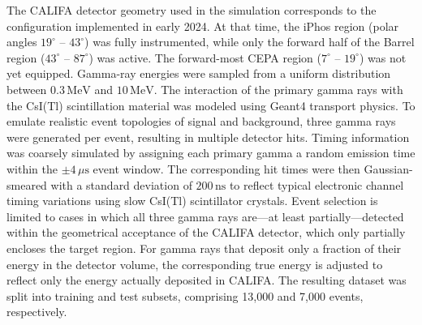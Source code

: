 \documentclass[final,5p,times,twocolumn]{elsarticle}
\begin{document}
The CALIFA detector geometry used in the simulation corresponds to the configuration implemented in early 2024. At that time, the iPhos region (polar angles $19^\circ$ -- $43^\circ$) was fully instrumented, while only the forward half of the Barrel region ($43^\circ$ -- $87^\circ$) was active. The forward-most CEPA region ($7^\circ$ -- $19^\circ$) was not yet equipped.\newline
Gamma-ray energies were sampled from a uniform distribution between $0.3\,\mathrm{MeV}$ and $10\,\mathrm{MeV}$. The interaction of the primary gamma rays with the CsI(Tl) scintillation material was modeled using Geant4 transport physics.\newline
To emulate realistic event topologies of signal and background, three gamma rays were generated per event, resulting in multiple detector hits. Timing information was coarsely simulated by assigning each primary gamma a random emission time within the $\pm 4\,\mu\mathrm{s}$ event window. The corresponding hit times were then Gaussian-smeared with a standard deviation of $200\,\mathrm{ns}$ to reflect typical electronic channel timing variations using slow CsI(Tl) scintillator crystals.\newline
Event selection is limited to cases in which all three gamma rays are---at least partially---detected within the geometrical acceptance of the CALIFA detector, which only partially encloses the target region. For gamma rays that deposit only a fraction of their energy in the detector volume, the corresponding true energy is adjusted to reflect only the energy actually deposited in CALIFA.\newline
The resulting dataset was split into training and test subsets, comprising 13{,}000 and 7{,}000 events, respectively.
\end{document}
